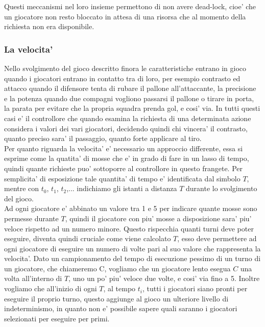 Questi meccanismi nel loro insieme permettono di non avere dead-lock, cioe' che un giocatore non resto bloccato in attesa di una risorsa che al momento della richiesta non era disponibile.

\subsubsection{La velocita'}
\label{sec:analisi_concorrenza_velocita}

Nello svolgimento del gioco descritto finora le caratteristiche entrano in gioco quando i giocatori entrano in contatto tra di loro, per esempio contrasto ed attacco quando il difensore tenta di rubare il pallone all'attaccante, la precisione e la potenza quando due compagni vogliono passarsi il pallone o tirare in porta, la parata per evitare che la propria squadra prenda gol, e cosi' via. In tutti questi casi e' il controllore che quando esamina la richiesta di una determinata azione considera i valori dei vari giocatori, decidendo quindi chi vincera' il contrasto, quanto preciso sara' il passaggio, quanto forte applicare al tiro.\\

Per quanto riguarda la velocita' e' necessario un approccio differente, essa si esprime come la quatita' di mosse che e' in grado di fare in un lasso di tempo, quindi quante richieste puo' sottoporre al controllore in questo frangete. Per semplicita' di esposizione tale quantita' di tempo e' identificata dal simbolo $T$, mentre con $t_0$, $t_1$, $t_2$,... indichiamo gli istanti a distanza $T$ durante lo svolgimento del gioco.\\

Ad ogni giocatore e' abbinato un valore tra 1 e 5 per indicare quante mosse sono permesse durante $T$, quindi il giocatore con piu' mosse a disposizione sara' piu' veloce rispetto ad un numero minore. Questo rispecchia quanti turni deve poter eseguire, diventa quindi cruciale come viene calcolato $T$, esso deve permettere ad ogni giocatore di eseguire un numero di volte pari al suo valore che rappresenta la velocita'. Dato un campionamento del tempo di esecuzione pessimo di un turno di un giocatore, che chiameremo C, vogliamo che un giocatore lento esegua $C$ una volta all'interno di $T$, uno un po' piu' veloce due volte, e cosi' via fino a 5. Inoltre vogliamo che all'inizio di ogni $T$, al tempo $t_i$, tutti i giocatori siano pronti per eseguire il proprio turno, questo aggiunge al gioco un ulteriore livello di indeterminismo, in quanto non e' possibile sapere quali saranno i giocatori selezionati per eseguire per primi.\\

